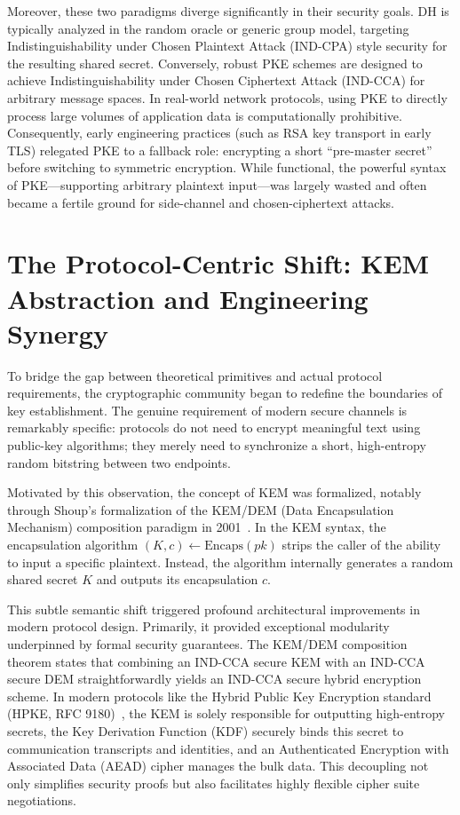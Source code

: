 Moreover, these two paradigms diverge significantly in their security goals. DH is typically analyzed in the random oracle or generic group model, targeting Indistinguishability under Chosen Plaintext Attack (IND-CPA) style security for the resulting shared secret. Conversely, robust PKE schemes are designed to achieve Indistinguishability under Chosen Ciphertext Attack (IND-CCA) for arbitrary message spaces. In real-world network protocols, using PKE to directly process large volumes of application data is computationally prohibitive. Consequently, early engineering practices (such as RSA key transport in early TLS) relegated PKE to a fallback role: encrypting a short ``pre-master secret'' before switching to symmetric encryption. While functional, the powerful syntax of PKE---supporting arbitrary plaintext input---was largely wasted and often became a fertile ground for side-channel and chosen-ciphertext attacks.

\section{The Protocol-Centric Shift: KEM Abstraction and Engineering Synergy}

To bridge the gap between theoretical primitives and actual protocol requirements, the cryptographic community began to redefine the boundaries of key establishment. The genuine requirement of modern secure channels is remarkably specific: protocols do not need to encrypt meaningful text using public-key algorithms; they merely need to synchronize a short, high-entropy random bitstring between two endpoints.

Motivated by this observation, the concept of KEM was formalized, notably through Shoup's formalization of the KEM/DEM (Data Encapsulation Mechanism) composition paradigm in 2001~\cite{shoup2001proposal}. In the KEM syntax, the encapsulation algorithm $(K, c) \gets \text{Encaps}(pk)$ strips the caller of the ability to input a specific plaintext. Instead, the algorithm internally generates a random shared secret $K$ and outputs its encapsulation $c$. 

This subtle semantic shift triggered profound architectural improvements in modern protocol design. Primarily, it provided exceptional modularity underpinned by formal security guarantees. The KEM/DEM composition theorem states that combining an IND-CCA secure KEM with an IND-CCA secure DEM straightforwardly yields an IND-CCA secure hybrid encryption scheme. In modern protocols like the Hybrid Public Key Encryption standard (HPKE, RFC 9180)~\cite{rfc9180}, the KEM is solely responsible for outputting high-entropy secrets, the Key Derivation Function (KDF) securely binds this secret to communication transcripts and identities, and an Authenticated Encryption with Associated Data (AEAD) cipher manages the bulk data. This decoupling not only simplifies security proofs but also facilitates highly flexible cipher suite negotiations.

